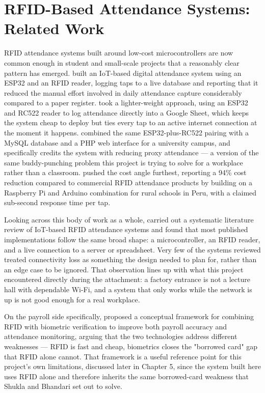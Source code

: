 \section{RFID-Based Attendance Systems: Related Work}

RFID attendance systems built around low-cost microcontrollers are now common enough in student and small-scale projects that a reasonably clear pattern has emerged. \textcite{singh2022iot} built an IoT-based digital attendance system using an ESP32 and an RFID reader, logging taps to a live database and reporting that it reduced the manual effort involved in daily attendance capture considerably compared to a paper register. \textcite{yadav2025rfid} took a lighter-weight approach, using an ESP32 and RC522 reader to log attendance directly into a Google Sheet, which keeps the system cheap to deploy but ties every tap to an active internet connection at the moment it happens. \textcite{hutabarat2025implementation} combined the same ESP32-plus-RC522 pairing with a MySQL database and a PHP web interface for a university campus, and specifically credits the system with reducing proxy attendance — a version of the same buddy-punching problem this project is trying to solve for a workplace rather than a classroom. \textcite{turpo2025edurfid} pushed the cost angle furthest, reporting a 94\% cost reduction compared to commercial RFID attendance products by building on a Raspberry Pi and Arduino combination for rural schools in Peru, with a claimed sub-second response time per tap.

Looking across this body of work as a whole, \textcite{ishaq2023iot} carried out a systematic literature review of IoT-based RFID attendance systems and found that most published implementations follow the same broad shape: a microcontroller, an RFID reader, and a live connection to a server or spreadsheet. Very few of the systems reviewed treated connectivity loss as something the design needed to plan for, rather than an edge case to be ignored. That observation lines up with what this project encountered directly during the attachment: a factory entrance is not a lecture hall with dependable Wi-Fi, and a system that only works while the network is up is not good enough for a real workplace.

On the payroll side specifically, \textcite{shukla2019conceptual} proposed a conceptual framework for combining RFID with biometric verification to improve both payroll accuracy and attendance monitoring, arguing that the two technologies address different weaknesses — RFID is fast and cheap, biometrics closes the "borrowed card" gap that RFID alone cannot. That framework is a useful reference point for this project's own limitations, discussed later in Chapter 5, since the system built here uses RFID alone and therefore inherits the same borrowed-card weakness that Shukla and Bhandari set out to solve.

